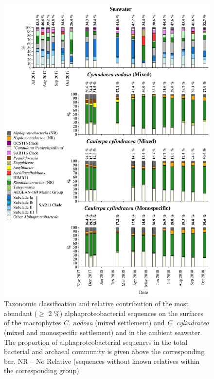 \documentclass[12pt,]{article}
\begin{document}
\begin{figure}[H]

{\centering \includegraphics[width=0.85\linewidth]{../results/figures/alphaproteobacteria_bar_plot} 

}

\caption{Taxonomic classification and relative contribution of the most abundant ($\geq$ 2 \si{\percent}) alphaproteobacterial sequences on the surfaces of the macrophytes \textit{C. nodosa} (mixed settlement) and \textit{C. cylindracea} (mixed and monospecific settlement) and in the ambient seawater. The proportion of alphaproteobacterial sequences in the total bacterial and archaeal community is given above the corresponding bar. NR -- No Relative (sequences without known relatives within the corresponding group)\label{alpha}}\label{fig:unnamed-chunk-7}
\end{figure}
\end{document}
